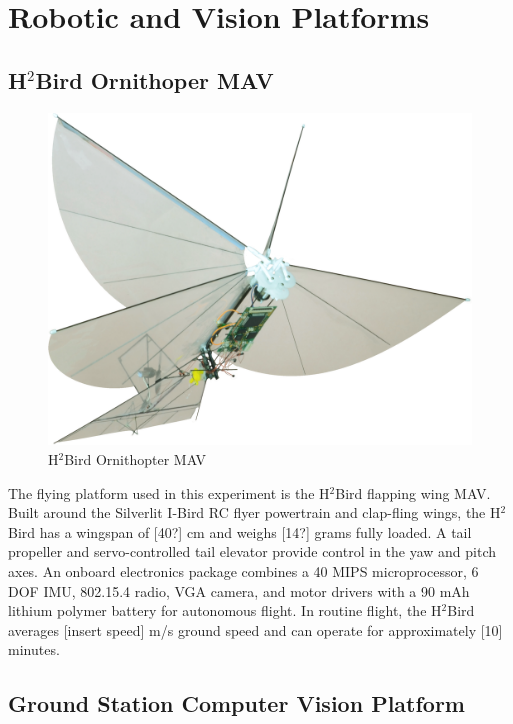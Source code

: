 \documentclass[letterpaper, 10 pt, conference]{ieeeconf}
\begin{document}
\section{Robotic and Vision Platforms}

\subsection{H$^2$Bird Ornithoper MAV}

\begin{figure}[tb]
\centering
\includegraphics[width=\linewidth]{figures/h2bird.png}
\caption{H$^2$Bird Ornithopter MAV}
\label{fig:h2bird}
\end{figure}

The flying platform used in this experiment is the H$^2$Bird flapping wing MAV. Built around the Silverlit I-Bird RC flyer powertrain and clap-fling wings, the H$^2$Bird has a wingspan of [40?] cm and weighs [14?] grams fully loaded. A tail propeller and servo-controlled tail elevator provide control in the yaw and pitch axes. An onboard electronics package combines a 40 MIPS microprocessor, 6 DOF IMU, 802.15.4 radio, VGA camera, and motor drivers with a 90 mAh lithium polymer battery for autonomous flight. In routine flight, the H$^2$Bird averages [insert speed] m/s ground speed and can operate for approximately [10] minutes.

\subsection{Ground Station Computer Vision Platform}
\end{document}
